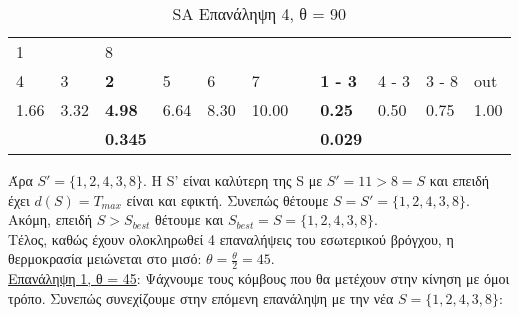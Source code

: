 \documentclass[12pt, a4paper]{article}
\begin{document}
\begin{table}[H]
\centering
\begin{tabular}{lllllllllll}
\multicolumn{1}{|l}{1}     & \multicolumn{1}{l|}{\textbf{}} & 8                                  &                           &                          &      &                                &                                     &                            &                            &      \\
\multicolumn{1}{|l|}{4}    & \multicolumn{1}{l|}{3}         & \multicolumn{1}{l|}{\textbf{2}}    & \multicolumn{1}{l|}{5}    & \multicolumn{1}{l|}{6}   & 7    & \multicolumn{1}{l|}{\textbf{}} & \multicolumn{1}{l|}{\textbf{1 - 3}} & \multicolumn{1}{l|}{4 - 3} & \multicolumn{1}{l|}{3 - 8} & out  \\ \cline{1-6} \cline{8-11} 
\multicolumn{1}{|l|}{1.66} & \multicolumn{1}{l|}{3.32}      & \multicolumn{1}{l|}{\textbf{4.98}} & \multicolumn{1}{l|}{6.64} & \multicolumn{1}{l|}{8.30} & 10.00 & \multicolumn{1}{l|}{\textbf{}} & \multicolumn{1}{l|}{\textbf{0.25}}  & \multicolumn{1}{l|}{0.50}  & \multicolumn{1}{l|}{0.75}  & 1.00 \\
                           &                                & \textbf{0.345}                     &                           &                          &      & \textbf{}                      & \textbf{0.029}                      &                            &                            &     
\end{tabular}
\caption{SA Επανάληψη 4, θ = 90}
\label{my-label}
\end{table}

Άρα \(S'=\{1,2,4,3,8\}\). Η S' είναι καλύτερη της S με \(S'=11>8=S\) και επειδή έχει \(d(S) = T_{max}\) είναι και εφικτή. Συνεπώς θέτουμε \(S = S' = \{1,2,4,3,8\}\). Ακόμη, επειδή \(S>S_{best}\) θέτουμε και \(S_{best} = S = \{1,2,4,3,8\}\). \\

Τέλος, καθώς έχουν ολοκληρωθεί 4 επαναλήψεις του εσωτερικού βρόγχου, η θερμοκρασία μειώνεται στο μισό: \(\theta = \frac{\theta}{2} = 45\). \\


\underline{Επανάληψη 1, θ = 45}: Ψάχνουμε τους κόμβους που θα μετέχουν στην κίνηση με όμοι τρόπο. Συνεπώς συνεχίζουμε στην επόμενη επανάληψη με την νέα \(S = \{1,2,4,3,8\}\):
\end{document}
